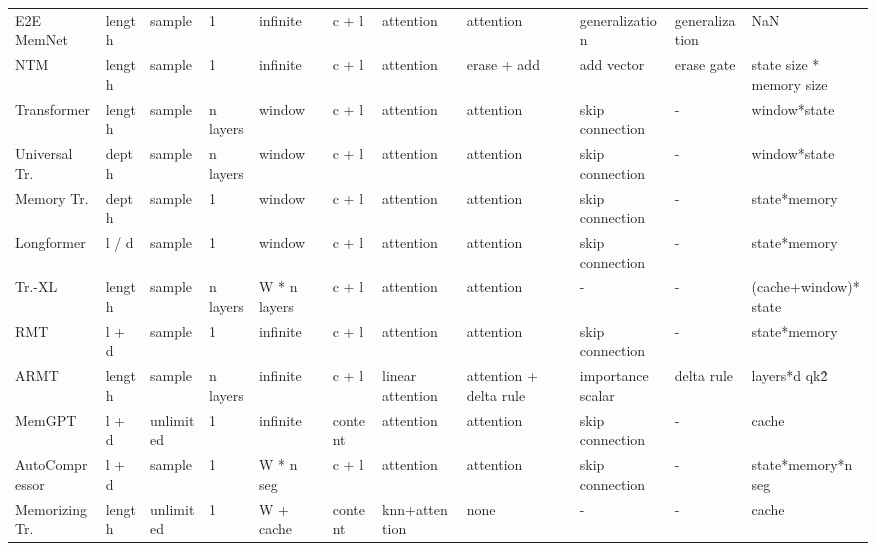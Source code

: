 \begin{table}[ht]
\begin{tabular}{lllllllllll}
      E2E MemNet &    length &    sample &        1 &     infinite &        c + l &        attention &              attention &    generalization & generalization &                      NaN \\
             NTM &    length &    sample &        1 &     infinite &        c + l &        attention &            erase + add &        add vector &     erase gate & state size * memory size \\
     Transformer &    length &    sample & n layers &       window &        c + l &        attention &              attention &   skip connection &              - &             window*state \\
   Universal Tr. &    depth  &    sample & n layers &       window &        c + l &        attention &              attention &   skip connection &              - &             window*state \\
      Memory Tr. &     depth &    sample &        1 &       window &        c + l &        attention &              attention &   skip connection &              - &             state*memory \\
      Longformer &     l / d &    sample &        1 &       window &        c + l &        attention &              attention &   skip connection &              - &             state*memory \\
          Tr.-XL &    length &    sample & n layers & W * n layers &        c + l &        attention &              attention &                 - &              - &    (cache+window)*state  \\
             RMT &     l + d &    sample &        1 &     infinite &        c + l &        attention &              attention &   skip connection &              - &             state*memory \\
            ARMT &    length &    sample & n layers &     infinite &        c + l & linear attention & attention + delta rule & importance scalar &     delta rule &           layers*d qk\^2 \\
          MemGPT &     l + d & unlimited &        1 &     infinite &      content &        attention &              attention &   skip connection &              - &                    cache \\
  AutoCompressor &     l + d &    sample &        1 &   W *  n seg &        c + l &        attention &              attention &   skip connection &              - &       state*memory*n seg \\
  Memorizing Tr. &    length & unlimited &        1 &    W + cache &      content &    knn+attention &                   none &                 - &              - &                    cache \\

\end{tabular}
\end{table}
